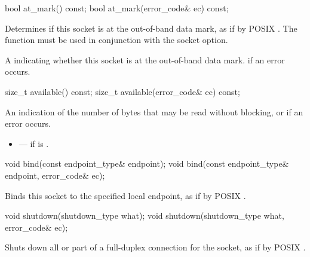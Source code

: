 \begin{itemdecl}
bool at_mark() const;
bool at_mark(error_code& ec) const;
\end{itemdecl}

\begin{itemdescr}
\pnum
\effects Determines if this socket is at the out-of-band data mark, as if by POSIX . \enternote The  function must be used in conjunction with the  socket option. \exitnote

\pnum
\returns A  indicating whether this socket is at the out-of-band data mark.  if an error occurs.
\end{itemdescr}

\begin{itemdecl}
size_t available() const;
size_t available(error_code& ec) const;
\end{itemdecl}

\begin{itemdescr}
\pnum
\returns An indication of the number of bytes that may be read without blocking, or  if an error occurs.

\pnum
\errors
\begin{itemize}
\item
{} --- if  is .
\end{itemize}
\end{itemdescr}

\begin{itemdecl}
void bind(const endpoint_type& endpoint);
void bind(const endpoint_type& endpoint, error_code& ec);
\end{itemdecl}

\begin{itemdescr}
\pnum
\effects Binds this socket to the specified local endpoint, as if by POSIX .
\end{itemdescr}

\begin{itemdecl}
void shutdown(shutdown_type what);
void shutdown(shutdown_type what, error_code& ec);
\end{itemdecl}

\begin{itemdescr}
\pnum
\effects Shuts down all or part of a full-duplex connection for the socket, as if by POSIX .
\end{itemdescr}

